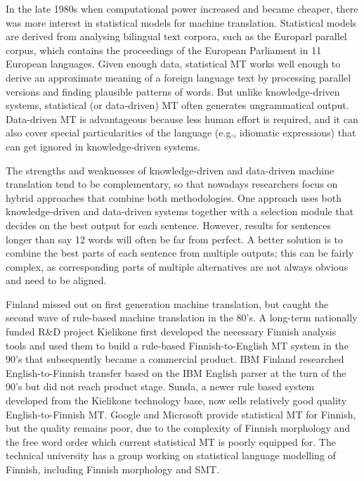 \documentclass[]{../../metanetpaper}
\begin{document}
\begin{Parallel}[c]{77mm}{77mm}
{In the late 1980s when computational power increased and became cheaper, there
was more interest in statistical models for machine translation. Statistical
models are derived from analysing bilingual text corpora, such as the Europarl
parallel corpus, which contains the proceedings of the European Parliament in
11 European languages. Given enough data, statistical MT works well enough to
derive an approximate meaning of a foreign language text by processing parallel
versions and finding plausible patterns of words. But unlike knowledge-driven
systems, statistical (or data-driven) MT often generates ungrammatical output.
Data-driven MT is advantageous because less human effort is required, and it
can also cover special particularities of the language (e.g., idiomatic
expressions) that can get ignored in knowledge-driven systems.




The strengths and weaknesses of knowledge-driven and data-driven machine
translation tend to be complementary, so that nowadays researchers focus on
hybrid approaches that combine both methodologies. One approach uses both
knowledge-driven and data-driven systems together with a selection module that
decides on the best output for each sentence. However, results for sentences
longer than say 12 words will often be far from perfect. A better solution is
to combine the best parts of each sentence from multiple outputs; this can be
fairly complex, as corresponding parts of multiple alternatives are not always
obvious and need to be aligned.

Finland missed out on first generation machine translation, but caught the
second wave of rule-based machine translation in the 80’s. A long-term
nationally funded R\&D project Kielikone first developed the necessary Finnish
analysis tools and used them to build a rule-based Finnish-to-English MT system
in the 90’s that subsequently became a commercial product. IBM Finland
researched English-to-Finnish transfer based on the IBM English parser at the
turn of the 90’s but did not reach product stage. Sunda, a newer rule based
system developed from the Kielikone technology base, now sells relatively good
quality English-to-Finnish MT. Google and Microsoft provide statistical MT for
Finnish, but the quality remains poor, due to the complexity of Finnish
morphology and the free word order which current statistical MT is poorly
equipped for. The technical university has a group working on statistical
language modelling of Finnish, including Finnish morphology and SMT.

}
\end{Parallel}
\end{document}

